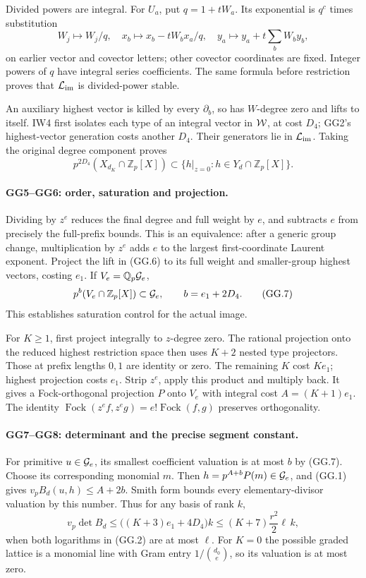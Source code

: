 Divided powers are integral. For $U_a$, put $q=1+tW_a$.
Its exponential is $q^c$ times substitution
\[
 W_j\mapsto W_j/q,\quad
 x_b\mapsto x_b-tW_bx_a/q,\quad
 y_a\mapsto y_a+t\sum_bW_by_b,                                 \tag{GG.5}
\]
on earlier vector and covector letters; other covector coordinates
are fixed. Integer powers of $q$ have integral series coefficients.
The same formula before restriction proves that $ {\cal L}_{\rm im}$
is divided-power stable.

An auxiliary highest vector is killed by every $\partial_b$, so has
$W$-degree zero and lifts to itself. IW4 first isolates each type of
an integral vector in $ {\cal W}$, at cost $D_4$; GG2's highest-vector
generation costs another $D_4$. Their generators lie in
$ {\cal L}_{\rm im}$. Taking the original degree component proves
\[
 p^{2D_4}(X_{d_K}\cap\mathbb Z_p[X])
       \subset\{h|_{z=0}:h\in Y_d\cap\mathbb Z_p[X]\}.           \tag{GG.6}
\]

\paragraph{GG5--GG6: order, saturation and projection.}
Dividing by $z^e$ reduces the final degree and full weight by $e$,
and subtracts $e$ from precisely the full-prefix bounds.
This is an equivalence: after a generic group change, multiplication
by $z^e$ adds $e$ to the largest first-coordinate Laurent exponent.
Project the lift in (GG.6) to its full weight and smaller-group
highest vectors, costing $e_1$. If $V_e=\mathbb Q_p{\cal G}_e$,
\[
 p^b(V_e\cap\mathbb Z_p[X])\subset{\cal G}_e,\qquad
 b=e_1+2D_4.                                                   \tag{GG.7}
\]
This establishes saturation control for the actual image.

For $K\ge1$, first project integrally to $z$-degree zero. The rational
projection onto the reduced highest restriction space then uses
$K+2$ nested type projectors. Those at prefix
lengths $0,1$ are identity or zero. The remaining $K$ cost $Ke_1$;
highest projection costs $e_1$. Strip $z^e$, apply this product and
multiply back. It gives a Fock-orthogonal projection $P$ onto $V_e$
with integral cost $A=(K+1)e_1$. The identity
$\operatorname{Fock}(z^ef,z^eg)=e!\operatorname{Fock}(f,g)$
preserves orthogonality.

\paragraph{GG7--GG8: determinant and the precise segment constant.}
For primitive $u\in{\cal G}_e$, its smallest coefficient valuation
is at most $b$ by (GG.7). Choose its corresponding monomial $m$.
Then $h=p^{A+b}P(m)\in{\cal G}_e$, and (GG.1) gives
$v_pB_d(u,h)\le A+2b$.
Smith form bounds every elementary-divisor valuation by this number.
Thus for any basis of rank $k$,
\[
 v_p\det B_d\le\bigl((K+3)e_1+4D_4\bigr)k
 \le (K+7)\frac{r^2}{2}\ell\,k,                                \tag{GG.8}
\]
when both logarithms in (GG.2) are at most $\ell$.
For $K=0$ the possible graded lattice is a monomial line with Gram
entry $1/\binom{d_0}{e}$, so its valuation is at most zero.

